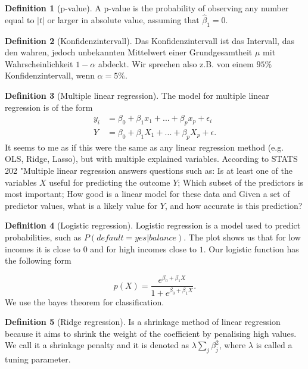 \documentclass{article}
\theoremstyle{definition}
\newtheorem{definition}{Definition}
\theoremstyle{Solution}
\begin{document}
\begin{definition}[p-value]
A p-value is the probability of observing any number equal to $|t|$ or larger in absolute value, assuming that $\hat{\beta}_1=0.$
\end{definition}

\begin{definition}[Konfidenzintervall]
Das Konfidenzintervall ist das Intervall, das den wahren, jedoch unbekannten Mittelwert einer Grundgesamtheit $\mu$ mit Wahrscheinlichkeit $1-\alpha$ abdeckt. Wir sprechen also z.B. von einem $95\%$ Konfidenzintervall, wenn $\alpha=5\%$.
\end{definition}

\begin{definition}[Multiple linear regression]
The model for multiple linear regression is of the form
\begin{equation}
	\begin{aligned}
		y_i&=\beta_0+\beta_1x_1+...+\beta_px_p+\epsilon_i \\
		Y&=\beta_0+\beta_1X_1+...+\beta_pX_p+\epsilon.
	\end{aligned}
\end{equation}
It seems to me as if this were the same as any linear regression method (e.g. OLS, Ridge, Lasso), but with multiple explained variables. According to STATS 202 "Multiple linear regression answers questions such as: Is at least one of the variables $X$ useful for predicting the outcome $Y$; Which subset of the predictors is most important; How good is a linear model for these data and Given a set of predictor values, what is a likely value for $Y$, and how accurate is this prediction?
\end{definition}

\begin{definition}[Logistic regression]
Logistic regression is a model used to predict probabilities, such as $P(default=yes | balance)$. The plot shows us that for low incomes it is close to $0$ and for high incomes close to $1$. Our logistic function has the following form

\begin{equation}
p(X)=\frac{e^{\beta_0+\beta_1X}}{1+e^{\beta_0+\beta_1X}}.
\end{equation}
We use the bayes theorem for classification.
\end{definition}

\begin{definition}[Ridge regression]
Is a shrinkage method of linear regression because it aims to shrink the weight of the coefficient by penalising high values. We call it a shrinkage penalty and it is denoted as $\lambda\sum_{j}^{}\beta_j^2$, where $\lambda$ is called a tuning parameter.
\end{definition}
\end{document}
